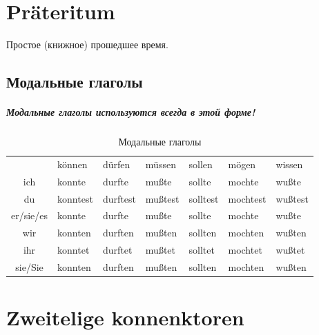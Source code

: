 \documentclass[12pt,a4paper]{report}
\begin{document}
\chapter{Präteritum}

Простое (книжное) прошедшее время.

\section{Модальные глаголы}

\paragraph{Модальные глаголы используются всегда в этой форме!}

\begin{longtable}{ c l l l l l l }
\caption{Модальные глаголы} \label{tab:long} \\
				& können 	& dürfen 	& müssen 	& sollen 	& mögen 	& wissen 	\\

	ich 		& konnte 	& durfte 	& mußte 	& sollte 	& mochte 	& wußte 	\\
	du 			& konntest 	& durftest	& mußtest	& solltest	& mochtest	& wußtest 	\\
	er/sie/es 	& konnte 	& durfte 	& mußte		& sollte	& mochte	& wußte		\\
	wir 		& konnten 	& durften 	& mußten	& sollten	& mochten	& wußten	\\
	ihr			& konntet 	& durftet 	& mußtet	& solltet	& mochtet	& wußtet	\\
	sie/Sie		& konnten 	& durften 	& mußten	& sollten	& mochten	& wußten	\\

\end{longtable}

\chapter{Zweitelige konnenktoren}
\end{document}
